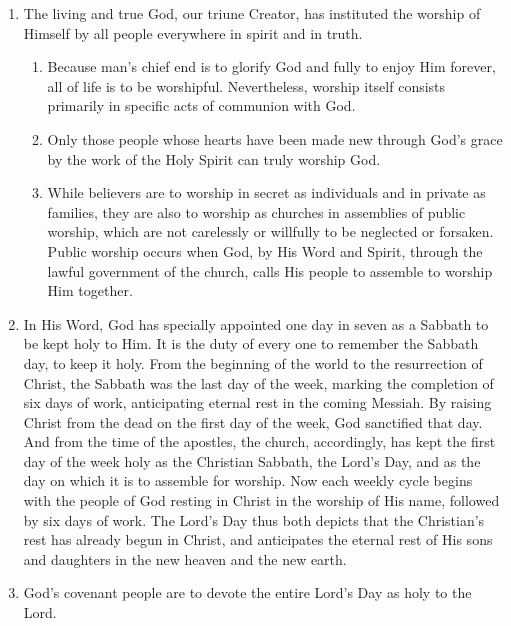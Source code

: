 \documentclass[
]{book}
\providecommand{\tightlist}{%
  \setlength{\itemsep}{0pt}\setlength{\parskip}{0pt}}
\begin{document}
\protect\hypertarget{chapter-slug-50-gods-institution-of-public-worship}{\href{}{}}

\begin{enumerate}
\def\labelenumi{\arabic{enumi}.}
\tightlist
\item
  \protect\hypertarget{50}{\href{}{}}The living and true God, our triune Creator, has instituted the worship of Himself by all people everywhere in spirit and in truth.

  \begin{enumerate}
  \def\labelenumii{\alph{enumii}.}
  \tightlist
  \item
    Because man's chief end is to glorify God and fully to enjoy Him forever, all of life is to be worshipful. Nevertheless, worship itself consists primarily in specific acts of communion with God.
  \item
    Only those people whose hearts have been made new through God's grace by the work of the Holy Spirit can truly worship God.
  \item
    While believers are to worship in secret as individuals and in private as families, they are also to worship as churches in assemblies of public worship, which are not carelessly or willfully to be neglected or forsaken. Public worship occurs when God, by His Word and Spirit, through the lawful government of the church, calls His people to assemble to worship Him together.
  \end{enumerate}
\item
  In His Word, God has specially appointed one day in seven as a Sabbath to be kept holy to Him. It is the duty of every one to remember the Sabbath day, to keep it holy. From the beginning of the world to the resurrection of Christ, the Sabbath was the last day of the week, marking the completion of six days of work, anticipating eternal rest in the coming Messiah. By raising Christ from the dead on the first day of the week, God sanctified that day. And from the time of the apostles, the church, accordingly, has kept the first day of the week holy as the Christian Sabbath, the Lord's Day, and as the day on which it is to assemble for worship. Now each weekly cycle begins with the people of God resting in Christ in the worship of His name, followed by six days of work. The Lord's Day thus both depicts that the Christian's rest has already begun in Christ, and anticipates the eternal rest of His sons and daughters in the new heaven and the new earth.
\item
  God's covenant people are to devote the entire Lord's Day as holy to the Lord.


\end{enumerate}
\end{document}
